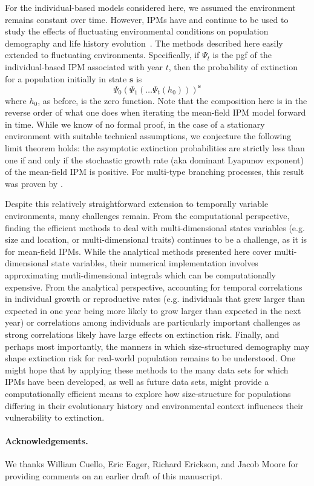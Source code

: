 \documentclass[12pt]{amsart}\usepackage[]{graphicx}\usepackage[]{color}
\def\s{\mathbf s}
\begin{document}
For the individual-based models considered here, we assumed the environment remains constant over time. However, IPMs have and continue to be used to study the effects of fluctuating environmental conditions on population demography and life history evolution~\citep{childs-etal-04,dahlgren-ehrlen-11,rees-ellner-09}. The methods described here easily extended to fluctuating environments. Specifically, if $\Psi_t$ is the pgf of the individual-based IPM associated with year $t$, then the probability of extinction for a population initially in state $\s$ is
\[
\Psi_0(\Psi_1(\dots \Psi_t(h_0)))^\s
\]
where $h_0$, as before, is the zero function. Note that the composition here is in the reverse order of what one does when iterating the mean-field IPM model forward in time. While we know of no formal proof, in the case of a stationary environment with suitable technical assumptions, we conjecture the following limit theorem holds: the asymptotic extinction probabilities are strictly less than one if and only if the stochastic growth rate (aka dominant Lyapunov exponent) of the mean-field IPM is positive. For multi-type branching processes, this result was proven by \citet{tanny-81}.

Despite this relatively straightforward extension to temporally variable environments, many challenges remain. From the computational perspective, finding the efficient methods to deal with multi-dimensional states variables (e.g. size and location, or multi-dimensional traits) continues to be a challenge, as it is for mean-field IPMs. While the analytical methods presented here cover multi-dimensional state variables, their numerical implementation involves approximating mutli-dimensional integrals which can be computationally expensive. From the analytical perspective, accounting for temporal correlations in individual growth or reproductive rates (e.g. individuals that grew larger than expected in one year being more likely to grow larger than expected in the next year) or correlations among individuals are particularly important challenges as strong correlations likely have large effects on extinction risk.
Finally, and perhaps most importantly, the  manners in which size-structured demography may shape extinction risk for real-world population remains to be understood. One might hope that by applying these methods to the many data sets for which IPMs have been developed, as well as future data sets, might provide a computationally efficient means to explore how size-structure for populations differing in their evolutionary history and environmental context influences their vulnerability to extinction.

\vskip 0.1in
\paragraph{\bf Acknowledgements.} We thanks William Cuello, Eric Eager, Richard Erickson, and Jacob Moore for providing comments on an earlier draft of this manuscript.

\end{document}
